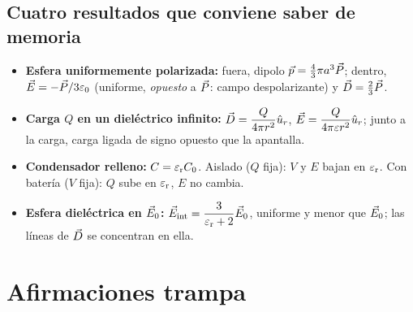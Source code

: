 \subsection{Cuatro resultados que conviene saber de memoria}

\begin{itemize}
  \item \textbf{Esfera uniformemente polarizada:} fuera, dipolo $\vec p=\tfrac43\pi a^3\vec P$; dentro, $\vec E=-\vec P/3\varepsilon_0$ (uniforme, \emph{opuesto} a $\vec P$:
        campo despolarizante) y $\vec D=\tfrac23\vec P$.
  \item \textbf{Carga $Q$ en un dieléctrico infinito:} $\vec D=\dfrac{Q}{4\pi r^2}\hat u_{r}$, $\vec E=\dfrac{Q}{4\pi\varepsilon r^2}\hat u_{r}$; junto a la carga, carga ligada de signo
        opuesto que la apantalla.
  \item \textbf{Condensador relleno:} $C=\varepsilon_{\mathrm r} C_0$. Aislado ($Q$ fija): $V$ y $E$ bajan en $\varepsilon_{\mathrm r}$. Con batería ($V$ fija): $Q$ sube en $\varepsilon_{\mathrm r}$, $E$ no cambia.
  \item \textbf{Esfera dieléctrica en $\vec E_0$:} $\vec E_{\mathrm{int}}=\dfrac{3}{\varepsilon_{\mathrm r}+2}\vec E_0$, uniforme y menor que $\vec E_0$; las líneas de $\vec D$ se concentran en ella.
\end{itemize}

\section{Afirmaciones trampa}\label{rsec:errores}


